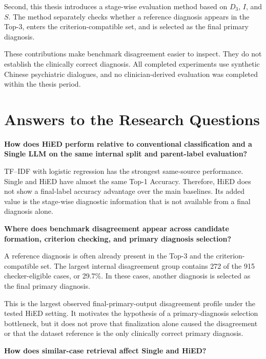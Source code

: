 \documentclass[12pt,a4paper,oneside]{report}
\begin{document}
Second, this thesis introduces a stage-wise evaluation method based on
$D_3$, $I$, and $S$. The method separately checks whether a reference
diagnosis appears in the Top-3, enters the criterion-compatible set, and
is selected as the final primary diagnosis.

These contributions make benchmark disagreement easier to inspect. They
do not establish the clinically correct diagnosis. All completed
experiments use synthetic Chinese psychiatric dialogues, and no
clinician-derived evaluation was completed within the thesis period.

\section{Answers to the Research Questions}

\begin{description}
[
style=nextline,
leftmargin=1.5cm,
labelwidth=1.1cm,
itemsep=0.4em,
parsep=0pt
]

\item[RQ1]
\textbf{How does HiED perform relative to conventional classification
and a Single LLM on the same internal split and parent-label
evaluation?}

TF--IDF with logistic regression has the strongest same-source
performance. Single and HiED have almost the same Top-1 Accuracy.
Therefore, HiED does not show a final-label accuracy advantage over the
main baselines. Its added value is the stage-wise diagnostic information
that is not available from a final diagnosis alone.

\item[RQ2]
\textbf{Where does benchmark disagreement appear across candidate
formation, criterion checking, and primary diagnosis selection?}

A reference diagnosis is often already present in the Top-3 and the
criterion-compatible set. The largest internal disagreement group
contains 272 of the 915 checker-eligible cases, or 29.7\%. In these cases,
another diagnosis is selected as the final primary diagnosis.

This is the largest observed final-primary-output disagreement profile
under the tested HiED setting. It motivates the hypothesis of a
primary-diagnosis selection bottleneck, but it does not prove that
finalization alone caused the disagreement or that the dataset reference
is the only clinically correct primary diagnosis.

\item[RQ3]
\textbf{How does similar-case retrieval affect Single and HiED?}


\end{description}
\end{document}
